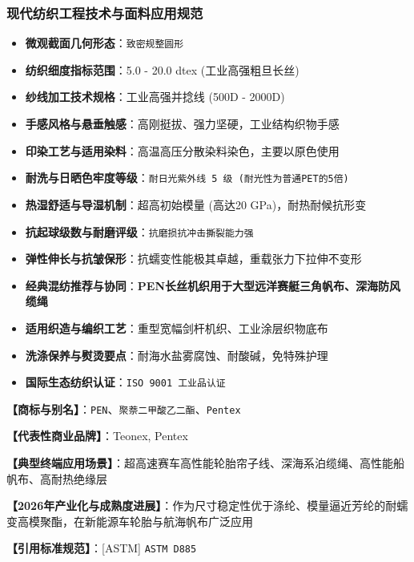 \documentclass[11pt,openright,twoside,UTF8]{ctexbook}
\begin{document}
\subsubsection*{现代纺织工程技术与面料应用规范}
\begin{itemize} \setlength{\itemsep}{2pt}
    \item \textbf{微观截面几何形态}：\texttt{致密规整圆形}
    \item \textbf{纺织细度指标范围}：5.0 - 20.0 dtex (工业高强粗旦长丝)
    \item \textbf{纱线加工技术规格}：工业高强并捻线 (500D - 2000D)
    \item \textbf{手感风格与悬垂触感}：高刚挺拔、强力坚硬，工业结构织物手感
    \item \textbf{印染工艺与适用染料}：高温高压分散染料染色，主要以原色使用
    \item \textbf{耐洗与日晒色牢度等级}：\texttt{耐日光紫外线 5 级 (耐光性为普通PET的5倍)}
    \item \textbf{热湿舒适与导湿机制}：超高初始模量 (高达20 GPa)，耐热耐候抗形变
    \item \textbf{抗起球级数与耐磨评级}：\texttt{抗磨损抗冲击撕裂能力强}
    \item \textbf{弹性伸长与抗皱保形}：抗蠕变性能极其卓越，重载张力下拉伸不变形
    \item \textbf{经典混纺推荐与协同}：\textbf{PEN长丝机织用于大型远洋赛艇三角帆布、深海防风缆绳}
    \item \textbf{适用织造与编织工艺}：重型宽幅剑杆机织、工业涂层织物底布
    \item \textbf{洗涤保养与熨烫要点}：耐海水盐雾腐蚀、耐酸碱，免特殊护理
    \item \textbf{国际生态纺织认证}：\texttt{ISO 9001 工业品认证}
\end{itemize}
\vspace{0.2cm}

\noindent\textbf{【商标与别名】}：\texttt{PEN}、\texttt{聚萘二甲酸乙二酯}、\texttt{Pentex}\par
\noindent\textbf{【代表性商业品牌】}：Teonex, Pentex\par
\noindent\textbf{【典型终端应用场景】}：超高速赛车高性能轮胎帘子线、深海系泊缆绳、高性能船帆布、高耐热绝缘层\par
\noindent\textbf{【2026年产业化与成熟度进展】}：作为尺寸稳定性优于涤纶、模量逼近芳纶的耐蠕变高模聚酯，在新能源车轮胎与航海帆布广泛应用\par
\noindent\textbf{【引用标准规范】}：[ASTM] \texttt{ASTM D885}\par
\vspace{0.5cm}
\end{document}

